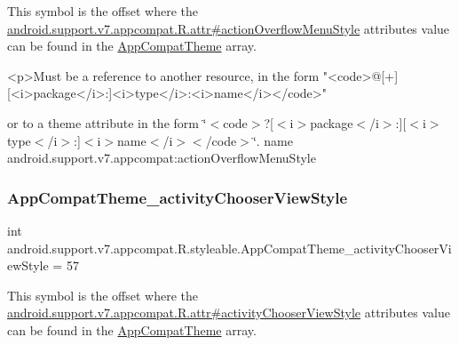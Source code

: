 This symbol is the offset where the \hyperlink{classandroid_1_1support_1_1v7_1_1appcompat_1_1R_1_1attr_a1283b228e85a0bcb0890079d6db3f115}{android.\+support.\+v7.\+appcompat.\+R.\+attr\#action\+Overflow\+Menu\+Style} attribute\textquotesingle{}s value can be found in the \hyperlink{classandroid_1_1support_1_1v7_1_1appcompat_1_1R_1_1styleable_a5c42f89e8a410c323be34208d75c430b}{App\+Compat\+Theme} array.

\begin{DoxyVerb}      <p>Must be a reference to another resource, in the form "<code>@[+][<i>package</i>:]<i>type</i>:<i>name</i></code>"
\end{DoxyVerb}
 or to a theme attribute in the form \char`\"{}$<$code$>$?\mbox{[}$<$i$>$package$<$/i$>$\+:\mbox{]}\mbox{[}$<$i$>$type$<$/i$>$\+:\mbox{]}$<$i$>$name$<$/i$>$$<$/code$>$\char`\"{}.  name android.\+support.\+v7.\+appcompat\+:action\+Overflow\+Menu\+Style \mbox{\label{classandroid_1_1support_1_1v7_1_1appcompat_1_1R_1_1styleable_a0023b350c96a4afa01a44c9f0bf8a3a1}} 
\subsubsection{\texorpdfstring{App\+Compat\+Theme\+\_\+activity\+Chooser\+View\+Style}{AppCompatTheme\_activityChooserViewStyle}}
{\footnotesize\ttfamily int android.\+support.\+v7.\+appcompat.\+R.\+styleable.\+App\+Compat\+Theme\+\_\+activity\+Chooser\+View\+Style = 57\hspace{0.3cm}{\ttfamily [static]}}

This symbol is the offset where the \hyperlink{classandroid_1_1support_1_1v7_1_1appcompat_1_1R_1_1attr_ac1069fbab9c478efc0e749a230df462b}{android.\+support.\+v7.\+appcompat.\+R.\+attr\#activity\+Chooser\+View\+Style} attribute\textquotesingle{}s value can be found in the \hyperlink{classandroid_1_1support_1_1v7_1_1appcompat_1_1R_1_1styleable_a5c42f89e8a410c323be34208d75c430b}{App\+Compat\+Theme} array.


